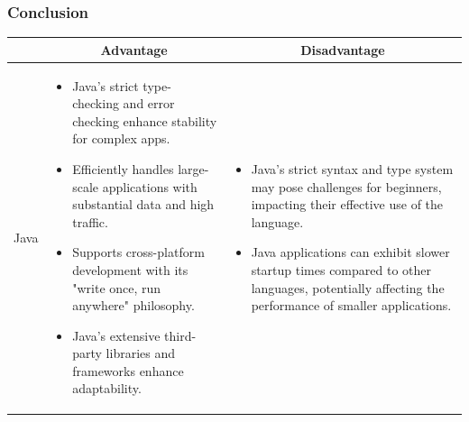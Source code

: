 \subsubsection{Conclusion}

\begin{table}[H]
    \centering
    \begin{tabular}{| c | p{} | p{} |}
        \hline
        \multicolumn{1}{|c|}{}
        & \multicolumn{1}{c|}{Advantage}
        & \multicolumn{1}{c|}{Disadvantage} \\ \hline
        \multirow{8}{*}{Java}     
                &   \begin{itemize}[leftmargin=*,topsep=0pt,partopsep=0pt,parsep=0pt]
                        \item Java's strict type-checking and error checking enhance stability for complex apps.
                        \item Efficiently handles large-scale applications with substantial data and high traffic.
                        \item Supports cross-platform development with its "write once, run anywhere" philosophy.
                        \item Java's extensive third-party libraries and frameworks enhance adaptability.
                    \end{itemize}
                &   \begin{itemize}[leftmargin=*,topsep=0pt,partopsep=0pt,parsep=0pt]
                        \item Java's strict syntax and type system may pose challenges for beginners, impacting their effective use of the language.

                        \item Java applications can exhibit slower startup times compared to other languages, potentially affecting the performance of smaller applications.
                        

\end{itemize}
\end{tabular}
\end{table}
